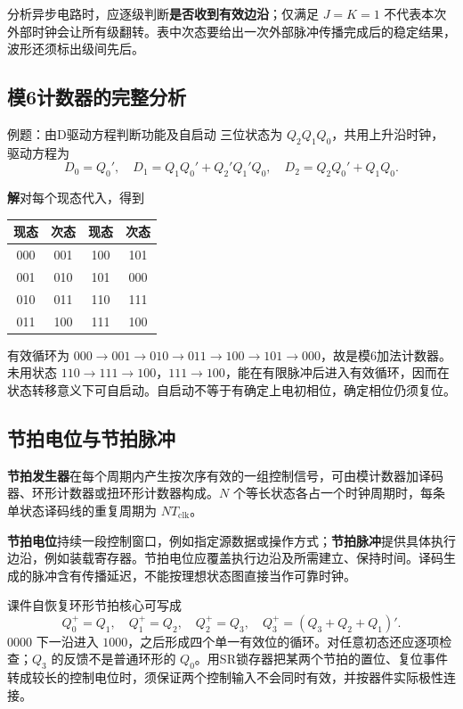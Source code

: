 \documentclass[UTF8,fontset=none,zihao=-4,a4paper]{ctexart}
\newcommand{\term}[1]{\textbf{#1}}
\newcommand{\sol}{\par\noindent\textbf{解}\quad}
\begin{document}
分析异步电路时，应逐级判断\textbf{是否收到有效边沿}；仅满足 $J=K=1$ 不代表本次外部时钟会让所有级翻转。表中次态要给出一次外部脉冲传播完成后的稳定结果，波形还须标出级间先后。

\subsection{模6计数器的完整分析}
\begin{infobox}{例题：由D驱动方程判断功能及自启动}
三位状态为 $Q_2Q_1Q_0$，共用上升沿时钟，驱动方程为
\[
D_0=Q_0',\quad D_1=Q_1Q_0'+Q_2'Q_1'Q_0,\quad
D_2=Q_2Q_0'+Q_1Q_0.
\]
\end{infobox}
\sol 对每个现态代入，得到
\begin{center}
\begin{tabular}{cc cc}
\toprule 现态&次态&现态&次态\\\midrule
000&001&100&101\\001&010&101&000\\010&011&110&111\\011&100&111&100\\\bottomrule
\end{tabular}
\end{center}
有效循环为 $000\to001\to010\to011\to100\to101\to000$，故是模6加法计数器。未用状态 $110\to111\to100$，$111\to100$，能在有限脉冲后进入有效循环，因而在状态转移意义下可自启动。自启动不等于有确定上电初相位，确定相位仍须复位。

\subsection{节拍电位与节拍脉冲}
\term{节拍发生器}在每个周期内产生按次序有效的一组控制信号，可由模计数器加译码器、环形计数器或扭环形计数器构成。$N$ 个等长状态各占一个时钟周期时，每条单状态译码线的重复周期为 $NT_{\mathrm{clk}}$。

\term{节拍电位}持续一段控制窗口，例如指定源数据或操作方式；\term{节拍脉冲}提供具体执行边沿，例如装载寄存器。节拍电位应覆盖执行边沿及所需建立、保持时间。译码生成的脉冲含有传播延迟，不能按理想状态图直接当作可靠时钟。

课件自恢复环形节拍核心可写成
\[
Q_0^+=Q_1,\quad Q_1^+=Q_2,\quad Q_2^+=Q_3,\quad
Q_3^+=(Q_3+Q_2+Q_1)'.
\]
$0000$ 下一沿进入 $1000$，之后形成四个单一有效位的循环。对任意初态还应逐项检查；$Q_3$ 的反馈不是普通环形的 $Q_0$。用SR锁存器把某两个节拍的置位、复位事件转成较长的控制电位时，须保证两个控制输入不会同时有效，并按器件实际极性连接。
\end{document}
